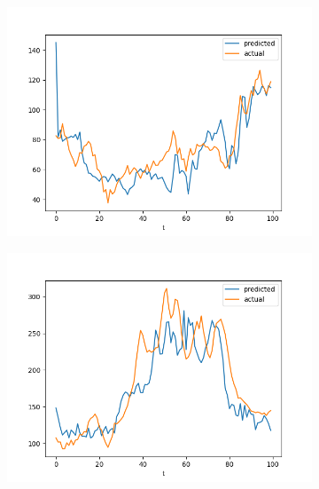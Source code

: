 \documentclass[runningheads]{llncs}
\begin{document}
\begin{figure}
\begin{subfigure}{\figwidth}
            \includegraphics[width=\textwidth]{results/evaluation/c_model_graph_p50.png}
        \end{subfigure}
        \begin{subfigure}{\figwidth}
            \includegraphics[width=\textwidth]{results/evaluation/c_model_graph_p60.png}
        \end{subfigure}
        \begin{subfigure}{\figwidth}

\end{subfigure}
\end{figure}
\end{document}
